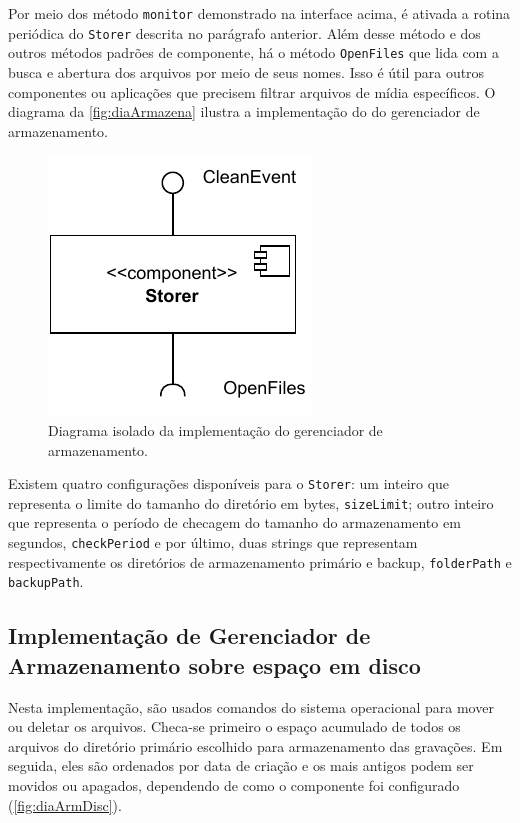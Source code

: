 \documentclass[12pt, %
openright, 
oneside, %
a4paper,    %
brazil]{facom-ufu-abntex2}
\begin{document}
Por meio dos método \texttt{monitor} demonstrado na interface acima, é ativada
a rotina periódica do \texttt{Storer} descrita no parágrafo anterior. Além
desse método e dos outros métodos padrões de componente, há o método
\texttt{OpenFiles} que lida com a busca e abertura dos arquivos por
meio de seus nomes. Isso é útil para outros componentes ou aplicações que
precisem filtrar arquivos de mídia específicos. O diagrama da
\autoref{fig:diaArmazena} ilustra a implementação do do gerenciador de
armazenamento.

\begin{figure}[!ht]
	\centering
	\includegraphics[width=0.3\linewidth]{storer.pdf}
	\caption[Diagrama isolado da implementação do gerenciador de
		armazenamento]{Diagrama isolado da implementação do gerenciador de
		armazenamento.}
	\label{fig:diaArmazena}
\end{figure}

Existem quatro configurações disponíveis para o \texttt{Storer}: um inteiro que
representa o limite do tamanho do diretório em bytes, \texttt{sizeLimit}; outro
inteiro que representa o período de checagem do tamanho do armazenamento em
segundos, \texttt{checkPeriod} e por último, duas strings que representam
respectivamente os diretórios de armazenamento primário e backup,
\texttt{folderPath} e \texttt{backupPath}.

\subsection{Implementação de Gerenciador de Armazenamento sobre espaço em
	disco}

Nesta implementação, são usados comandos do sistema operacional para mover ou
deletar os arquivos. Checa-se primeiro o espaço acumulado de todos os arquivos
do diretório primário escolhido para armazenamento das gravações. Em seguida,
eles são ordenados por data de criação e os mais antigos podem ser movidos ou
apagados, dependendo de como o componente foi configurado
(\autoref{fig:diaArmDisc}).
\end{document}
